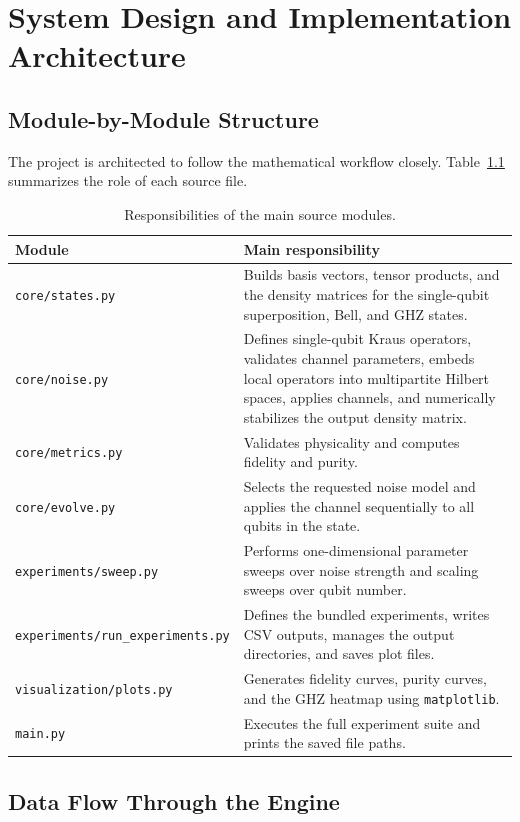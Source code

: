 \chapter{System Design and Implementation Architecture}

\section{Module-by-Module Structure}

The project is architected to follow the mathematical workflow closely. Table~\ref{tab:modules} summarizes the role of each source file.

\begin{table}[t]
\centering
\caption{Responsibilities of the main source modules.}
\label{tab:modules}
\begin{tabular}{p{3.1cm} p{10.2cm}}
\toprule
Module & Main responsibility \\
\midrule
\texttt{core/states.py} & Builds basis vectors, tensor products, and the density matrices for the single-qubit superposition, Bell, and GHZ states. \\
\texttt{core/noise.py} & Defines single-qubit Kraus operators, validates channel parameters, embeds local operators into multipartite Hilbert spaces, applies channels, and numerically stabilizes the output density matrix. \\
\texttt{core/metrics.py} & Validates physicality and computes fidelity and purity. \\
\texttt{core/evolve.py} & Selects the requested noise model and applies the channel sequentially to all qubits in the state. \\
\texttt{experiments/sweep.py} & Performs one-dimensional parameter sweeps over noise strength and scaling sweeps over qubit number. \\
\texttt{experiments/run\_experiments.py} & Defines the bundled experiments, writes CSV outputs, manages the output directories, and saves plot files. \\
\texttt{visualization/plots.py} & Generates fidelity curves, purity curves, and the GHZ heatmap using \texttt{matplotlib}. \\
\texttt{main.py} & Executes the full experiment suite and prints the saved file paths. \\
\bottomrule
\end{tabular}
\end{table}

\section{Data Flow Through the Engine}

